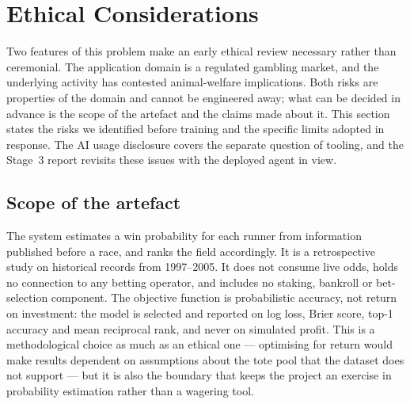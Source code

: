 %
%
%
\providecommand{\PEND}[1]{\textbf{[#1]}}

\section{Ethical Considerations}
\label{sec:ethics}

Two features of this problem make an early ethical review necessary
rather than ceremonial. The application domain is a regulated gambling
market, and the underlying activity has contested animal-welfare
implications. Both risks are properties of the domain and cannot be
engineered away; what can be decided in advance is the scope of the
artefact and the claims made about it. This section states the risks we
identified before training and the specific limits adopted in response.
The AI usage disclosure covers the separate question of tooling,
and the Stage~3 report revisits these issues with the deployed agent in
view.

\subsection{Scope of the artefact}

The system estimates a win probability for each runner from information
published before a race, and ranks the field accordingly. It is a
retrospective study on historical records from 1997--2005. It does not
consume live odds, holds no connection to any betting operator, and
includes no staking, bankroll or bet-selection component. The objective
function is probabilistic accuracy, not return on investment: the model
is selected and reported on log loss, Brier score, top-1 accuracy and mean
reciprocal rank, and never on simulated profit. This is a methodological
choice as much as an ethical one --- optimising for return would make
results dependent on assumptions about the tote pool that the dataset does
not support --- but it is also the boundary that keeps the project an
exercise in probability estimation rather than a wagering tool.

